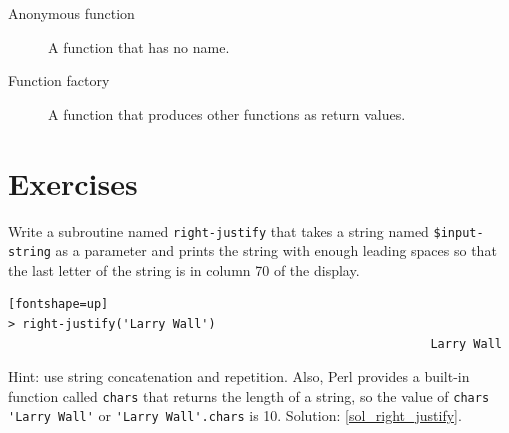 \begin{description}
\item[Anonymous function] A function that has no name.

\item[Function factory] A function that produces other functions as return values.

\end{description}


\section{Exercises}

\begin{exercise}
\label{right_justify}

Write a subroutine named \verb"right-justify" that takes a string
named {\tt \$input-string} as a parameter and prints the 
string with enough leading spaces so that the last letter 
of the string is in column 70 of the display.

\begin{verbatim}[fontshape=up]
> right-justify('Larry Wall')
                                                           Larry Wall
\end{verbatim}

Hint: use string concatenation and repetition.  Also,
Perl provides a built-in function called {\tt chars} that
returns the length of a string, so the value of 
\verb"chars 'Larry Wall'" or \verb"'Larry Wall'.chars" is 10.
Solution: \ref{sol_right_justify}.

\end{exercise}


